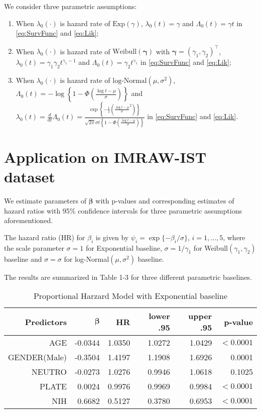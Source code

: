 \documentclass[11pt]{article}
\newcommand{\bbeta}{{\bm \beta}}
\newcommand{\bgamma}{{\bm \gamma}}
\begin{document}
We consider three parametric assumptions:

\begin{enumerate}
\item When $\lambda_0(\cdot)$ is hazard rate of $\text{Exp}(\gamma)$, 
  $\lambda_0(t)=\gamma$ and $\Lambda_0(t)=\gamma t$ in \eqref{eq:SurvFunc} and \eqref{eq:Lik};
\item When $\lambda_0(\cdot)$ is hazard rate of $\text{Weibull}(\bgamma)$ with
  $\bgamma=(\gamma_1,\gamma_2)^{\top}$, $\lambda_0(t)=\gamma_1\gamma_2
  t^{\gamma_1 - 1}$ and $\Lambda_0(t) = \gamma_2 t^{\gamma_1}$ in \eqref{eq:SurvFunc} and \eqref{eq:Lik};
\item When $\lambda_0(\cdot)$ is hazard rate of
  $\text{log-Normal}(\mu,\sigma^2)$, $\Lambda_0(t) = -\log \left\{ 1- \Phi
    \left( \frac{\log t - \mu}{\sigma} \right)\right\}$ and $\lambda_0(t) =
  \frac{d}{dt}\Lambda_0(t) = \frac{\exp \left\{ -\frac{1}{2} \left( \frac{\log t
      - \mu}{\sigma}^2 \right)\right\}}{\sqrt{2\pi}\sigma t \left\{ 1-\Phi \left(
      \frac{\log t - \mu}{\sigma} \right) \right\}}$ in \eqref{eq:SurvFunc} and \eqref{eq:Lik}.
\end{enumerate}

\section{Application on IMRAW-IST dataset}
We estimate parameters of $\bbeta$ with p-values and corresponding estimates of
hazard ratios with 95\% confidence intervals for three parametric assumptions
aforementioned.

The hazard ratio (HR) for $\beta_i$ is given by $\psi_i = \exp
\{-\beta_i/\sigma\}$, $i=1,\dots,5$, where the scale parameter $\sigma=1$ for Exponential baseline,
$\sigma=1/\gamma_1$ for Weibull$(\gamma_1,\gamma_2)$ baseline and
$\sigma=\sigma$ for log-Normal$(\mu,\sigma^2)$ baseline.

The results are summarized in Table 1-3 for three different parametric baselines.

\begin{table}[ht]\label{tab:exp}
\caption{Proportional Harzard Model with Exponential baseline}
\centering
\begin{tabular}{rrrrrr}
  \hline
  \hline
  Predictors & $\bbeta$ & HR & lower .95 & upper .95 & p-value \\ 
  \hline
AGE & -0.0344 & 1.0350 & 1.0272 & 1.0429 & $<0.0001$ \\ 
  GENDER(Male) & -0.3504 & 1.4197 & 1.1908 & 1.6926 & 0.0001 \\ 
  NEUTRO & -0.0273 & 1.0276 & 0.9946 & 1.0618 & 0.1025 \\ 
  PLATE & 0.0024 & 0.9976 & 0.9969 & 0.9984 & $<0.0001$ \\ 
  NIH & 0.6682 & 0.5127 & 0.3780 & 0.6953 & $<0.0001$ \\ 
   \hline
\end{tabular}
\end{table}
\end{document}
